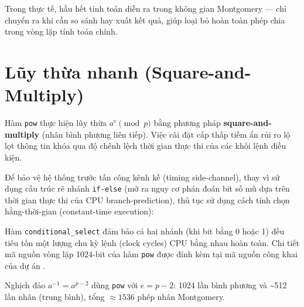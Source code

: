 Trong thực tế, hầu hết tính toán diễn ra trong không gian Montgomery ---
chỉ chuyển ra khi cần so sánh hay xuất kết quả, giúp loại bỏ hoàn toàn
phép chia trong vòng lặp tính toán chính.

\section{Lũy thừa nhanh
(Square-and-Multiply)}\label{lux169y-thux1eeba-nhanh-square-and-multiply}

Hàm \texttt{pow} thực hiện lũy thừa \(a^e \pmod{p}\) bằng phương pháp
\textbf{square-and-multiply} (nhân bình phương liên tiếp). Việc cài đặt
cấp thấp tiềm ẩn rủi ro lộ lọt thông tin khóa qua độ chênh lệch thời
gian thực thi của các khối lệnh điều kiện.

Để bảo vệ hệ thống trước tấn công kênh kề (timing side-channel), thay vì
sử dụng cấu trúc rẽ nhánh \texttt{if-else} (mở ra nguy cơ phán đoán bit
số mũ dựa trên thời gian thực thi của CPU branch-prediction), thủ tục sử
dụng cách tính chọn hằng-thời-gian (constant-time execution):

\begin{Shaded}
\begin{Highlighting}[]
\OperatorTok{=}\OperatorTok{*}\OperatorTok{;}
\OperatorTok{=} \PreprocessorTok{::}\OperatorTok{\&}\OperatorTok{,} \OperatorTok{\&}\OperatorTok{,}\OperatorTok{;}
\end{Highlighting}
\end{Shaded}

\label{lst:ch2_pow_constant_time}\vspace{12pt}

Hàm \texttt{conditional\_select} đảm bảo cả hai nhánh (khi bit bằng 0
hoặc 1) đều tiêu tốn một lượng chu kỳ lệnh (clock cycles) CPU bằng nhau
hoàn toàn. Chi tiết mã nguồn vòng lặp 1024-bit của hàm \texttt{pow} được
đính kèm tại mã nguồn công khai của dự án \citep{LumenMath}.

Nghịch đảo \(a^{-1} = a^{p-2}\) dùng \texttt{pow} với \(e = p - 2\):
1024 lần bình phương và \textasciitilde512 lần nhân (trung bình), tổng
\(\approx 1536\) phép nhân Montgomery.

\FloatBarrier
